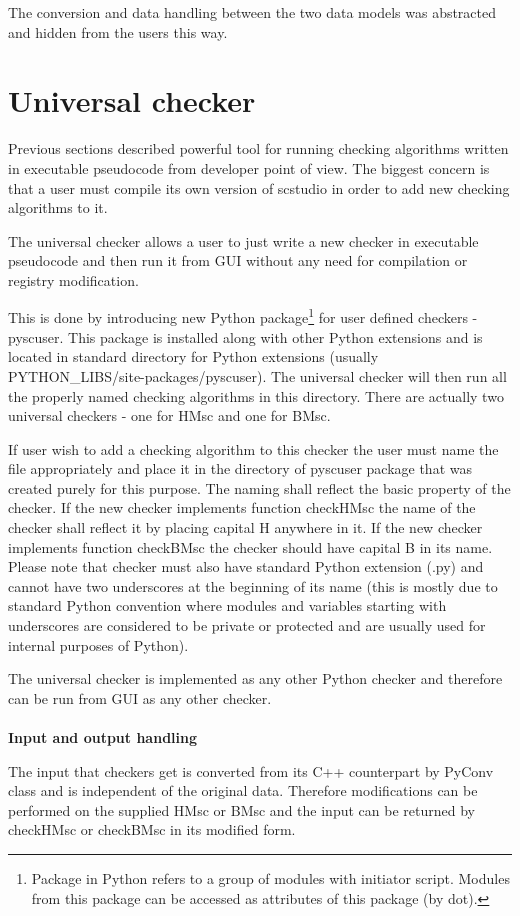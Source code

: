 \documentclass[11pt,oneside]{fithesis2}
\newcommand{\markit}[1]{\ \\\\{\noindent\textbf{#1}}}
\begin{document}
The conversion and data handling between the two data models was abstracted and hidden from the users this way.

\section{Universal checker}
Previous sections described powerful tool for running checking algorithms written in executable pseudocode from developer point of view. The biggest concern is that a user must compile its own version of scstudio in order to add new checking algorithms to it.

The universal checker allows a user to just write a new checker in executable pseudocode and then run it from GUI without any need for compilation or registry modification.

This is done by introducing new Python package\footnote{Package in Python refers to a group of modules with initiator script. Modules from this package can be accessed as attributes of this package (by dot).} for user defined checkers - pyscuser. This package is installed along with other Python extensions and is located in standard directory for Python extensions (usually PYTHON\_LIBS/site-packages/pyscuser). The universal checker will then run all the properly named checking algorithms in this directory. There are actually two universal checkers - one for HMsc and one for BMsc.

If user wish to add a checking algorithm to this checker the user must name the file appropriately and place it in the directory of pyscuser package that was created purely for this purpose. The naming shall reflect the basic property of the checker. If the new checker implements function checkHMsc the name of the checker shall reflect it by placing capital H anywhere in it. If the new checker implements function checkBMsc the checker should have capital B in its name. Please note that checker must also have standard Python extension (.py) and cannot have two underscores at the beginning of its name (this is mostly due to standard Python convention where modules and variables starting with underscores are considered to be private or protected and are usually used for internal purposes of Python).

The universal checker is implemented as any other Python checker and therefore can be run from GUI as any other checker.
\markit{Input and output handling}

The input that checkers get is converted from its C++ counterpart by PyConv class and is independent of the original data. Therefore modifications can be performed on the supplied HMsc or BMsc and the input can be returned by checkHMsc or checkBMsc in its modified form.
\end{document}
